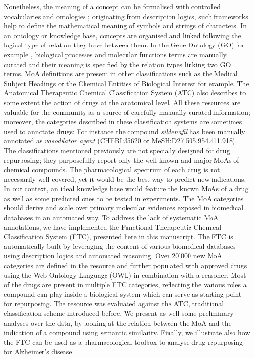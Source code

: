 \documentclass{bioinfo}
\begin{document}
Nonetheless, the meaning of a concept can be formalised with controlled vocabularies and ontologies \citep{Gruber1995}; 
originating from description logics, such frameworks help to define the mathematical meaning of symbols and strings of characters. 
In an ontology or knowledge base, concepts are organised and linked following the logical type of relation they have between them. 
In the Gene Ontology (GO) for example \citep{Ashburner2000}, biological processes and molecular functions terms are manually curated  
and their meaning is specified by the relation types linking two GO terms.
MoA definitions are present in other classifications such as the Medical Subject Headings \citep{Nelson2004} or the Chemical Entities of 
Biological Interest \citep{Hastings2012} for example. The Anatomical Therapeutic 
Chemical Classification System (ATC) \citep{world2000anatomical} also describes to some 
extent the action of drugs at the anatomical level. All these resources are valuable for the community as a source of carefully 
manually curated information; moreover, the categories described in these classification systems are sometimes used to annotate 
drugs: For instance the compound \emph{sildenafil} has been manually annotated as \emph{vasodilator agent} (CHEBI:35620 or MeSH:D27.505.954.411.918).
The classifications mentioned previously are not specially designed for drug repurposing; they purposefully report only the 
well-known and major MoAs of chemical compounds. The pharmacological spectrum of each drug is not necessarily well covered, yet 
it would be the best way to predict new indications. In our context, an ideal knowledge base would feature the known MoAs of a 
drug as well as some predicted ones to be tested in experiments. The MoA categories should derive and scale over primary molecular 
evidences exposed in biomedical databases in an automated way.
To address the lack of systematic MoA annotations, we have implemented the Functional Therapeutic Chemical 
Classification System (FTC), presented here in this manuscript. The FTC is automatically built by leveraging the content 
of various biomedical databases using description logics and automated reasoning. Over 20'000 new MoA categories are defined 
in the resource and further populated with approved drugs using the Web Ontology Language (OWL) in combination with a reasoner. 
Most of the drugs are present in multiple FTC categories, reflecting the various roles a compound can play inside a biological system which 
can serve as starting point for repurposing. 
The resource was evaluated against the ATC, traditional classification scheme introduced before. We present as well some preliminary 
analyses over the data, by looking at the relation between the MoA and the indication of a compound using semantic similarity. 
Finally, we illustrate also how the FTC can be used as a pharmacological toolbox to analyse drug repurposing for Alzheimer’s disease.
\end{document}
